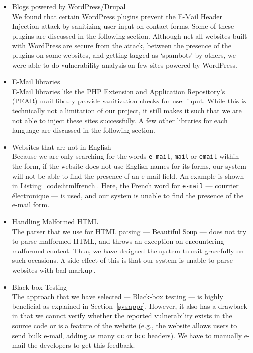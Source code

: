 \begin{itemize}
		\item Blogs powered by WordPress/Drupal\\
		We found that certain WordPress plugins prevent the E-Mail Header Injection attack by sanitizing user input on contact forms. Some of these plugins are discussed in the following section. Although not all websites built with WordPress are secure from the attack, between the presence of the plugins on some websites, and getting tagged as `spambots' by others, we were able to do vulnerability analysis on few sites powered by WordPress.

		\item E-Mail libraries\\
        E-Mail libraries like the PHP Extension and Application Repository's (PEAR) mail library provide sanitization checks for user input. While this is technically not a limitation of our project, it still makes it such that we are not able to inject these sites successfully.
        A few other libraries for each language are discussed in the following section.

        \item Websites that are not in English\\
        Because we are only searching for the words \texttt{e-mail}, \texttt{mail} or \texttt{email} within the form, if the website does not use English names for its forms, our system will not be able to find the presence of an e-mail field. An example is shown in Listing~\ref{code:htmlfrench}. Here, the French word for \texttt{e-mail} --- courrier électronique --- is used, and our system is unable to find the presence of the e-mail form.

        \item Handling Malformed HTML\\
        The parser that we use for HTML parsing --- Beautiful Soup --- does not try to parse malformed HTML, and throws an exception on encountering malformed content. Thus, we have designed the system to exit gracefully on such occasions. A side-effect of this is that our system is unable to parse websites with bad markup\,\footnotemark.



        \item Black-box Testing\\
        The approach that we have selected --- Black-box testing --- is highly beneficial as explained in Section~\ref{sys:appr}. However, it also has a drawback in that we cannot verify whether the reported vulnerability exists in the source code or is a feature of the website (e.g., the website allows users to send bulk e-mail, adding as many \texttt{cc} or \texttt{bcc} headers). We have to manually e-mail the developers to get this feedback.


\end{itemize}
